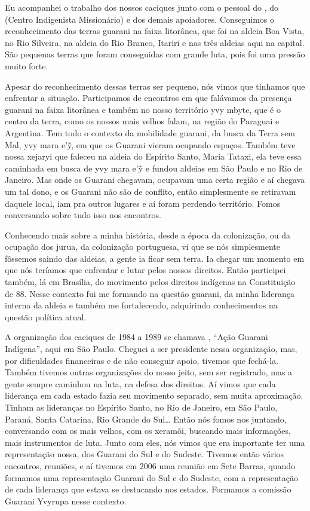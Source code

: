 Eu acompanhei o trabalho dos nossos caciques junto com o pessoal do ,
do  (Centro Indigenista Missionário) e dos demais apoiadores.
Conseguimos o reconhecimento das terras guarani na faixa litorânea, que
foi na aldeia Boa Vista, no Rio Silveira, na aldeia do Rio Branco,
Itariri e nas três aldeias aqui na capital. São pequenas terras que
foram conseguidas com grande luta, pois foi uma pressão muito forte. 

Apesar do reconhecimento dessas terras ser pequeno, nós vimos que
tínhamos que enfrentar a situação. Participamos de encontros em que
falávamos da presença guarani na faixa litorânea e também no nosso
território yvy mbyte, que é o centro da terra, como os nossos mais
velhos falam, na região do Paraguai e Argentina. Tem todo o contexto da
mobilidade guarani, da busca da Terra sem Mal, yvy mara e’ỹ, em que
os Guarani vieram ocupando espaços. Também teve nossa xejaryi que
faleceu na aldeia do Espírito Santo, Maria Tataxi, ela
teve essa caminhada em busca de yvy mara e’ỹ e fundou aldeias em
São Paulo e no Rio de Janeiro. Mas onde os Guarani chegavam, ocupavam
uma certa região e aí chegava um tal dono, e os Guarani não são de
conflito, então simplesmente se retiravam daquele local, iam pra outros
lugares e aí foram perdendo território. Fomos conversando sobre tudo
isso nos encontros.

Conhecendo mais sobre a minha história, desde a época da colonização, ou
da ocupação dos jurua, da colonização portuguesa, vi que se nós
simplesmente fôssemos saindo das aldeias, a gente ia ficar sem terra.
Ia chegar um momento em que nós teríamos que enfrentar e lutar pelos
nossos direitos. Então participei também, lá em Brasília, do movimento
pelos direitos indígenas na Constituição de 88. Nesse contexto fui me
formando na questão guarani, da minha liderança interna da aldeia e
também me fortalecendo, adquirindo conhecimentos na questão política
atual.

A organização dos caciques de 1984 a 1989 se chamava , ``Ação
Guarani Indígena'', aqui em São Paulo. Cheguei a ser presidente nessa
organização, mas, por dificuldades financeiras e de não conseguir
apoio, tivemos que fechá-la. Também tivemos outras organizações do
nosso jeito, sem ser registrado, mas a gente sempre caminhou na luta,
na defesa dos direitos. Aí vimos que cada liderança em cada estado
fazia seu movimento separado, sem muita aproximação. Tinham as
lideranças no Espírito Santo, no Rio de Janeiro, em São Paulo, Paraná,
Santa Catarina, Rio Grande do Sul\ldots{} Então nós fomos nos juntando,
conversando com os mais velhos, com os xeramõi, buscando mais
informações, mais instrumentos de luta. Junto com eles, nós vimos que
era importante ter uma representação nossa, dos Guarani do Sul e do
Sudeste. Tivemos então vários encontros, reuniões, e aí tivemos em 2006
uma reunião em Sete Barras, quando formamos uma representação Guarani
do Sul e do Sudeste, com a representação de cada liderança que estava
se destacando nos estados. Formamos a comissão Guarani Yvyrupa nesse
contexto. 

